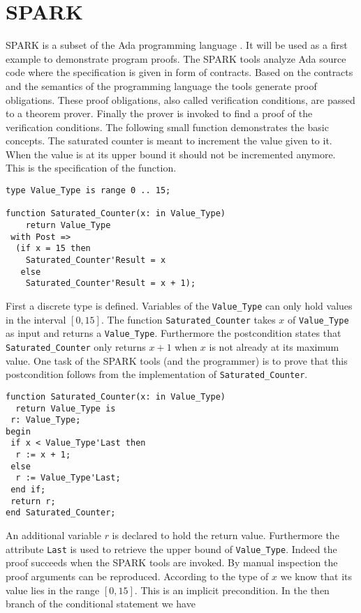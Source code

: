 \section{SPARK}

SPARK is a subset of the Ada programming language \cite{spark14}. It will be 
used as a first example to demonstrate program proofs. The SPARK tools
analyze Ada source code where the specification is given in form of 
contracts. Based on the contracts and the semantics of the programming
language the tools generate proof obligations. These proof obligations,
also called verification conditions, are passed to a theorem prover.
Finally the prover is invoked to find a proof of the verification 
conditions.
The following small function demonstrates the basic concepts. The 
saturated counter is meant to increment the value given to it. When the
value is at its upper bound it should not be incremented anymore.
This is the specification of the function.
\begin{lstlisting}
type Value_Type is range 0 .. 15;

function Saturated_Counter(x: in Value_Type) 
    return Value_Type
 with Post =>
  (if x = 15 then
    Saturated_Counter'Result = x
   else 
    Saturated_Counter'Result = x + 1);
\end{lstlisting}
First a discrete type is defined. Variables of the \verb"Value_Type" can only
hold values in the interval $[0, 15]$. The function \verb"Saturated_Counter"
takes $x$ of \verb"Value_Type" as input and returns a \verb"Value_Type". Furthermore the 
postcondition states that \verb"Saturated_Counter" only returns $x + 1$ when $x$ is
not already at its maximum value. One task of the SPARK tools (and 
the programmer) is to prove that this postcondition follows from the 
implementation of \verb"Saturated_Counter".
\begin{lstlisting}
function Saturated_Counter(x: in Value_Type) 
  return Value_Type is
 r: Value_Type;
begin
 if x < Value_Type'Last then
  r := x + 1;
 else
  r := Value_Type'Last;
 end if;
 return r;
end Saturated_Counter;
\end{lstlisting}
An additional variable $r$ is declared to hold the return value. Furthermore
the attribute \verb"Last" is used to retrieve the upper bound of \verb"Value_Type".
Indeed the proof succeeds when the SPARK tools are invoked. By manual
inspection the proof arguments can be reproduced. According to the type
of $x$ we know that its value lies in the range $[0, 15]$. This is an implicit
precondition. In the then branch of the conditional statement we have

